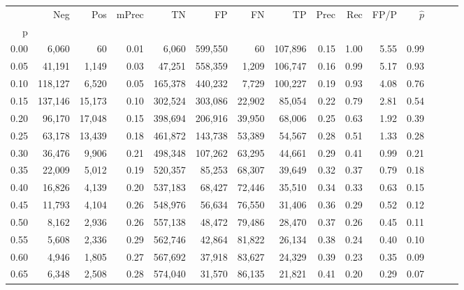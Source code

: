 \begin{tabular}{rrrrrrrrrrrrrrr}
\toprule
{} &      Neg &     Pos & mPrec &       TN &       FP &       FN &       TP &  Prec &   Rec &  FP/P & $\hat{p}$ \\
p    &          &         &       &          &          &          &          &       &       &       &           \\
\midrule
0.00 &    6,060 &      60 &  0.01 &    6,060 &  599,550 &       60 &  107,896 &  0.15 &  1.00 &  5.55 &      0.99 \\
0.05 &   41,191 &   1,149 &  0.03 &   47,251 &  558,359 &    1,209 &  106,747 &  0.16 &  0.99 &  5.17 &      0.93 \\
0.10 &  118,127 &   6,520 &  0.05 &  165,378 &  440,232 &    7,729 &  100,227 &  0.19 &  0.93 &  4.08 &      0.76 \\
0.15 &  137,146 &  15,173 &  0.10 &  302,524 &  303,086 &   22,902 &   85,054 &  0.22 &  0.79 &  2.81 &      0.54 \\
0.20 &   96,170 &  17,048 &  0.15 &  398,694 &  206,916 &   39,950 &   68,006 &  0.25 &  0.63 &  1.92 &      0.39 \\
0.25 &   63,178 &  13,439 &  0.18 &  461,872 &  143,738 &   53,389 &   54,567 &  0.28 &  0.51 &  1.33 &      0.28 \\
0.30 &   36,476 &   9,906 &  0.21 &  498,348 &  107,262 &   63,295 &   44,661 &  0.29 &  0.41 &  0.99 &      0.21 \\
0.35 &   22,009 &   5,012 &  0.19 &  520,357 &   85,253 &   68,307 &   39,649 &  0.32 &  0.37 &  0.79 &      0.18 \\
0.40 &   16,826 &   4,139 &  0.20 &  537,183 &   68,427 &   72,446 &   35,510 &  0.34 &  0.33 &  0.63 &      0.15 \\
0.45 &   11,793 &   4,104 &  0.26 &  548,976 &   56,634 &   76,550 &   31,406 &  0.36 &  0.29 &  0.52 &      0.12 \\
0.50 &    8,162 &   2,936 &  0.26 &  557,138 &   48,472 &   79,486 &   28,470 &  0.37 &  0.26 &  0.45 &      0.11 \\
0.55 &    5,608 &   2,336 &  0.29 &  562,746 &   42,864 &   81,822 &   26,134 &  0.38 &  0.24 &  0.40 &      0.10 \\
0.60 &    4,946 &   1,805 &  0.27 &  567,692 &   37,918 &   83,627 &   24,329 &  0.39 &  0.23 &  0.35 &      0.09 \\
0.65 &    6,348 &   2,508 &  0.28 &  574,040 &   31,570 &   86,135 &   21,821 &  0.41 &  0.20 &  0.29 &      0.07 \\

\end{tabular}

